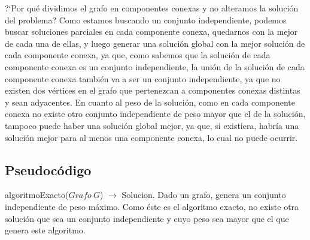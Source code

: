\documentclass[a4paper, 10pt]{article}
\begin{document}
?`Por qu\'e dividimos el grafo en componentes conexas y no alteramos la soluci\'on del problema? Como estamos buscando un conjunto independiente, podemos buscar soluciones parciales en cada componente conexa, quedarnos con la mejor de cada una de ellas, y luego generar una soluci\'on global con la mejor soluci\'on de cada componente conexa, ya que, como sabemos que la soluci\'on de cada componente conexa es un conjunto independiente, la uni\'on de la soluci\'on de cada componente conexa tambi\'en va a ser un conjunto independiente, ya que no existen dos v\'ertices en el grafo que pertenezcan a componentes conexas distintas y sean adyacentes. En cuanto al peso de la soluci\'on, como en cada componente conexa no existe otro conjunto independiente de peso mayor que el de la soluci\'on, tampoco puede haber una soluci\'on global mejor, ya que, si existiera, habr\'ia una soluci\'on mejor para al menos una componente conexa, lo cual no puede ocurrir.  \\

\newpage

\subsection{Pseudoc\'odigo}
algoritmoExacto($Grafo \ G$) $\rightarrow$ Solucion. Dado un grafo, genera un conjunto independiente de peso m\'aximo. Como \'este es el algoritmo exacto, no existe otra soluci\'on que sea un conjunto independiente y cuyo peso sea mayor que el que genera este algoritmo. \\
\end{document}
